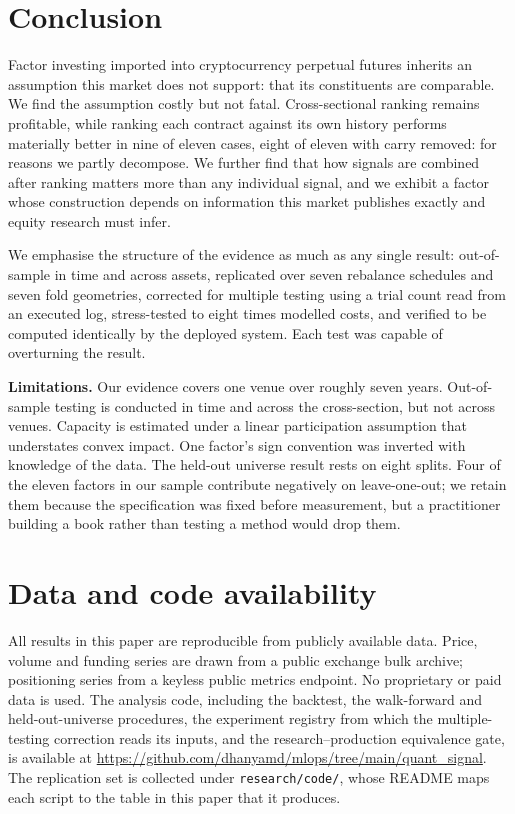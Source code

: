 \documentclass[11pt,letterpaper]{article}
\newif\ifanon\anonfalse   %
\begin{document}
\section{Conclusion}

Factor investing imported into cryptocurrency perpetual futures inherits an
assumption this market does not support: that its constituents are comparable. We
find the assumption costly but not fatal. Cross-sectional ranking remains
profitable, while ranking each contract against its own history performs
materially better in nine of eleven cases, eight of eleven with carry removed: 
for reasons we partly decompose. We further find that how signals are combined
after ranking matters more than any individual signal, and we exhibit a factor
whose construction depends on information this market publishes exactly and
equity research must infer.

We emphasise the structure of the evidence as much as any single result:
out-of-sample in time and across assets, replicated over seven rebalance schedules
and seven fold geometries, corrected for multiple testing using a trial count read
from an executed log, stress-tested to eight times modelled costs, and verified to
be computed identically by the deployed system. Each test was capable of
overturning the result.

\textbf{Limitations.} Our evidence covers one venue over roughly seven years.
Out-of-sample testing is conducted in time and across the cross-section, but not
across venues. Capacity is estimated under a linear participation assumption that
understates convex impact. One factor's sign convention was inverted with
knowledge of the data. The held-out universe result rests on eight splits. Four of the eleven factors in
our sample contribute negatively on leave-one-out; we retain them because the
specification was fixed before measurement, but a practitioner building a book
rather than testing a method would drop them.

\section*{Data and code availability}

All results in this paper are reproducible from publicly available data. Price,
volume and funding series are drawn from a public exchange bulk archive;
positioning series from a keyless public metrics endpoint. No proprietary or paid
data is used. The analysis code, including the backtest, the walk-forward and
held-out-universe procedures, the experiment registry from which the
multiple-testing correction reads its inputs, and the research--production
equivalence gate, is\ifanon{} available from the author on request and will be
released publicly on acceptance.\else{} available at
\url{https://github.com/dhanyamd/mlops/tree/main/quant_signal}. The replication
set is collected under \texttt{research/code/}, whose README maps each script to
the table in this paper that it produces.\fi
\end{document}
